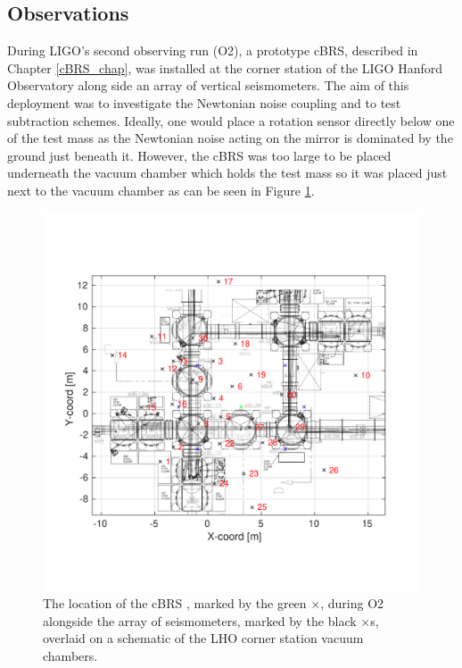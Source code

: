 \documentclass [12pt, proquest]{uwthesis}[2019]
\begin{document}
\subsection{Observations}

During LIGO's second observing run (O2), a prototype cBRS, described in Chapter \ref{cBRS_chap}, was installed at the corner station of the LIGO Hanford Observatory along side an array of vertical seismometers. The aim of this deployment was to investigate the Newtonian noise coupling and to test subtraction schemes. Ideally, one would place a rotation sensor directly below one of the test mass as the Newtonian noise acting on the mirror is dominated by the ground just beneath it. However, the cBRS was too large to be placed underneath the vacuum chamber which holds the test mass so it was placed just next to the vacuum chamber as can be seen in Figure \ref{NNArray}.

\begin{figure}[!h]
\begin{center}
\includegraphics[width=\textwidth]{NNArray.pdf}
\end{center}
\caption[The location of the cBRS during O2 alongside the array of seismometers]{The location of the cBRS , marked by the green $\times$, during O2 alongside the array of seismometers, marked by the black $\times$s, overlaid on a schematic of the LHO corner station vacuum chambers.}
\label{NNArray}
\end{figure}
\end{document}
